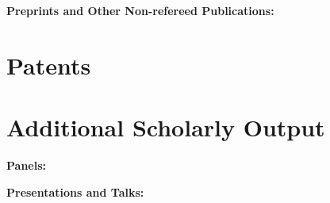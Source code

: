 \documentclass[wideaddress]{vitae}
\begin{document}
\begin{refsection}
  \textbf{Preprints and Other Non-refereed Publications:}
  \nocite{cao2023real,Kopper:2009ij,Judge:2008vn,Kopper:2008dp}
  \printbibliography[heading=none]
\end{refsection}

\section{Patents}
\begin{refsection}
  \nocite{Kopper:2019af, Kopper:2020aa}
  \printbibliography[heading=none]
\end{refsection}

\section{Additional Scholarly Output}

\begin{refsection}
  \textbf{Panels:}
  \nocite{Andrade:2018aa,Yang:2017aa,Bruzelius:2016hb,Kopper:2016cl,North:2015db,Waid:2023aa}
  \printbibliography[heading=none]
\end{refsection}

\begin{refsection}
  \textbf{Presentations and Talks:}
  \nocite{Kopper:2020ab,Kopper:2020ac,Kopper:2019ag,Kopper:2019ae,Kopper:2019ad,Kopper:2019ac,Kopper:2019ab,Kopper:2019aa,Kopper:2018aa,Kopper:2016ng,Kopper:2015fi,Kopper:2015wj,Kopper:2014ys,Kopper:2014jo,Kopper:2014zv,Kopper:2013yi,Kopper:2013yk,Kopper:2012yw,Kopper:2012fd,Kopper:2011vp,Kopper:2011tn,Kopper:2008mw}
  \printbibliography[heading=none]
\end{refsection}
\end{document}
